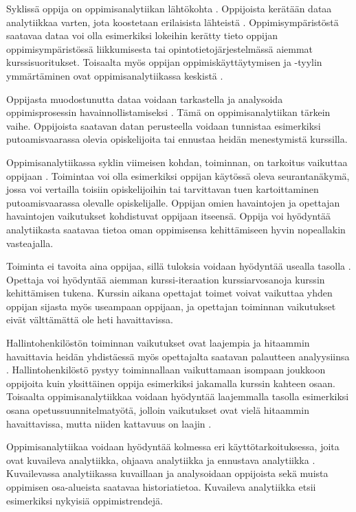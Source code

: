 Syklissä oppija on oppimisanalytiikan lähtökohta \citep{clowLearningAnalyticsCycle2012}. Oppijoista kerätään dataa analytiikkaa varten, jota koostetaan erilaisista lähteistä \citep{wolffImprovingRetentionPredicting2013}. Oppimisympäristöstä saatavaa dataa voi olla esimerkiksi lokeihin kerätty tieto oppijan oppimisympäristössä liikkumisesta tai opintotietojärjestelmässä aiemmat kurssisuoritukset. Toisaalta myös oppijan oppimiskäyttäytymisen ja -tyylin ymmärtäminen ovat oppimisanalytiikassa keskistä \citep{hasanPredictingStudentPerformance2020}.

Oppijasta muodostunutta dataa voidaan tarkastella ja analysoida oppimisprosessin havainnollistamiseksi \citep{clowLearningAnalyticsCycle2012}. Tämä on oppimisanalytiikan tärkein vaihe. Oppijoista saatavan datan perusteella voidaan tunnistaa esimerkiksi putoamisvaarassa olevia opiskelijoita tai ennustaa heidän menestymistä kurssilla.

Oppimisanalytiikassa syklin viimeisen kohdan, toiminnan, on tarkoitus vaikuttaa oppijaan \citep{clowLearningAnalyticsCycle2012}. Toimintaa voi olla esimerkiksi oppijan käytössä oleva seurantanäkymä, jossa voi vertailla toisiin opiskelijoihin tai tarvittavan tuen kartoittaminen putoamisvaarassa olevalle opiskelijalle. Oppijan omien havaintojen ja opettajan havaintojen vaikutukset kohdistuvat oppijaan itseensä. Oppija voi hyödyntää analytiikasta saatavaa tietoa oman oppimisensa kehittämiseen hyvin nopeallakin vasteajalla.

Toiminta ei tavoita aina oppijaa, sillä tuloksia voidaan hyödyntää usealla tasolla \citep{clowLearningAnalyticsCycle2012}. Opettaja voi hyödyntää aiemman kurssi-iteraation kurssiarvosanoja kurssin kehittämisen tukena. Kurssin aikana opettajat toimet voivat vaikuttaa yhden oppijan sijasta myös useampaan oppijaan, ja opettajan toiminnan vaikutukset eivät välttämättä ole heti havaittavissa.

Hallintohenkilöstön toiminnan vaikutukset ovat laajempia ja hitaammin havaittavia heidän yhdistäessä myös opettajalta saatavan palautteen analyysiinsa \citep{clowLearningAnalyticsCycle2012}. Hallintohenkilöstö pystyy toiminnallaan vaikuttamaan isompaan joukkoon oppijoita kuin yksittäinen oppija esimerkiksi jakamalla kurssin kahteen osaan. Toisaalta oppimisanalytiikkaa voidaan hyödyntää laajemmalla tasolla esimerkiksi osana opetussuunnitelmatyötä, jolloin vaikutukset ovat vielä hitaammin havaittavissa, mutta niiden kattavuus on laajin \citep{clowOverviewLearningAnalytics2013}.

\color{blue}
Oppimisanalytiikaa voidaan hyödyntää kolmessa eri käyttötarkoituksessa, joita ovat kuvaileva analytiikka, ohjaava analytiikka ja ennustava analytiikka \citep{auvinenOppimisanalytiikkaTuleeOletko2017, danielBigDataAnalytics2015}. Kuvailevassa analytiikassa kuvaillaan ja analysoidaan oppijoista sekä muista oppimisen osa-alueista saatavaa historiatietoa. Kuvaileva analytiikka etsii esimerkiksi nykyisiä oppimistrendejä.


